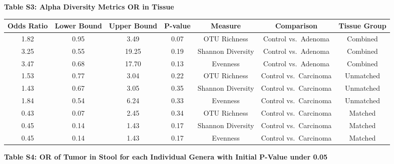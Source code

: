 \documentclass[12pt,]{article}
\begin{document}
\newpage

\textbf{Table S3: Alpha Diversity Metrics OR in Tissue}

\begin{longtable}[]{@{}ccccccc@{}}
\toprule
Odds Ratio & Lower Bound & Upper Bound & P-value & Measure & Comparison
& Tissue Group\tabularnewline
\midrule
\endhead
1.82 & 0.95 & 3.49 & 0.07 & OTU Richness & Control vs.~Adenoma &
Combined\tabularnewline
3.25 & 0.55 & 19.25 & 0.19 & Shannon Diversity & Control vs.~Adenoma &
Combined\tabularnewline
3.47 & 0.68 & 17.70 & 0.13 & Evenness & Control vs.~Adenoma &
Combined\tabularnewline
1.53 & 0.77 & 3.04 & 0.22 & OTU Richness & Control vs.~Carcinoma &
Unmatched\tabularnewline
1.43 & 0.67 & 3.05 & 0.35 & Shannon Diversity & Control vs.~Carcinoma &
Unmatched\tabularnewline
1.84 & 0.54 & 6.24 & 0.33 & Evenness & Control vs.~Carcinoma &
Unmatched\tabularnewline
0.43 & 0.07 & 2.45 & 0.34 & OTU Richness & Control vs.~Carcinoma &
Matched\tabularnewline
0.45 & 0.14 & 1.43 & 0.17 & Shannon Diversity & Control vs.~Carcinoma &
Matched\tabularnewline
0.45 & 0.14 & 1.43 & 0.17 & Evenness & Control vs.~Carcinoma &
Matched\tabularnewline
\bottomrule
\end{longtable}

\newpage

\textbf{Table S4: OR of Tumor in Stool for each Individual Genera with
Initial P-Value under 0.05}
\end{document}
